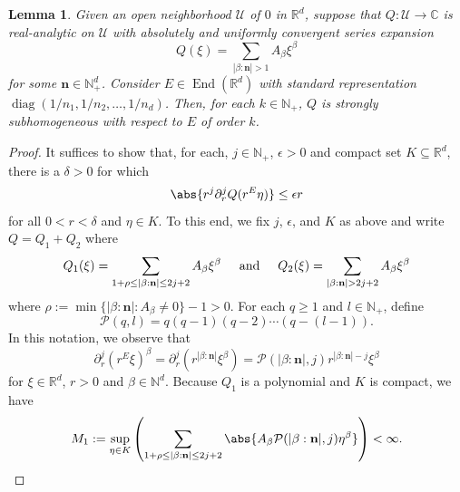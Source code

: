 \documentclass[11pt, letter]{book}
\newtheorem{lemma}[theorem]{Lemma}
\newcommand\End{\operatorname{End}} %
\newcommand\diag{\operatorname{diag}}
\newcommand{\lp}{\left(}
\newcommand{\rp}{\right)}
\begin{document}
\begin{framed}
\begin{lemma}
Given an open neighborhood $\mathcal{U}$ of $0$ in $\mathbb{R}^d$, suppose that $Q:\mathcal{U}\to\mathbb{C}$ is real-analytic on $\mathcal{U}$ with absolutely and uniformly convergent series expansion
\begin{equation*}
    Q(\xi)=\sum_{|\beta:\mathbf{n}|>1}A_\beta\xi^\beta
\end{equation*}
for some $\mathbf{n}\in\mathbb{N}_+^d$. Consider $E\in\End(\mathbb{R}^d)$ with standard representation $\diag(1/n_1,1/n_2,\dots,1/n_d)$. Then, for each $k\in\mathbb{N}_+$, $Q$ is strongly subhomogeneous with respect to $E$ of order $k$. 
\end{lemma}
\end{framed}
\begin{proof}
It suffices to show that, for each, $j\in\mathbb{N}_+$, $\epsilon>0$ and compact set $K\subseteq\mathbb{R}^d$, there is a $\delta>0$ for which
\begin{equation*}
    \abs{r^j\partial_r^jQ(r^E\eta)}\leq \epsilon r
\end{equation*}
for all $0<r<\delta$ and $\eta\in K$. To this end, we fix $j$, $\epsilon$, and $K$ as above and write $Q=Q_1+Q_2$ where
\begin{equation*}
Q_1(\xi)=\sum_{1+\rho\leq |\beta:\mathbf{n}|\leq 2j+2}A_\beta\xi^\beta
\hspace{0.5cm}\mbox{and}\hspace{0.5cm}
    Q_2(\xi)=\sum_{|\beta:\mathbf{n}|> 2j+2}A_{\beta}\xi^\beta
\end{equation*}
where $\rho:=\min\{|\beta:\mathbf{n}|:A_\beta\neq 0\}-1>0$.
For each $q\geq 1$ and $l\in \mathbb{N}_+$, define
\begin{equation*}
    \mathcal{P}(q,l)=q(q-1)(q-2)\cdots (q-(l-1)).
\end{equation*}
In this notation, we observe that 
\begin{equation*}
    \partial_r^j(r^E\xi)^\beta=\partial_r^j\left(r^{|\beta:\mathbf{n}|}\xi^\beta\right)=\mathcal{P}(|\beta:\mathbf{n}|,j)r^{|\beta:\mathbf{n}|-j}\xi^\beta
\end{equation*}
for $\xi\in\mathbb{R}^d$, $r>0$ and $\beta\in\mathbb{N}^d$.
Because $Q_1$ is a polynomial and $K$ is compact, we have
\begin{equation*}
    M_1:=\sup_{\eta\in K}\lp\sum_{1+\rho\leq |\beta:\mathbf{n}|\leq 2j+2}\abs{A_\beta \mathcal{P}(|\beta:\mathbf{n}|,j)\eta^\beta}\rp<\infty.
\end{equation*}

\end{proof}
\end{document}
